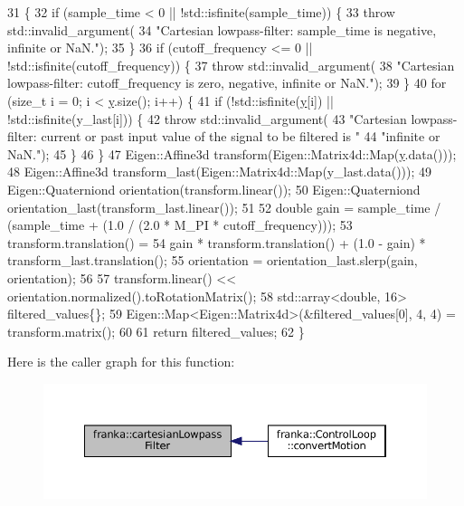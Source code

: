\begin{DoxyCode}
31                                                                        \{
32   \textcolor{keywordflow}{if} (sample\_time < 0 || !std::isfinite(sample\_time)) \{
33     \textcolor{keywordflow}{throw} std::invalid\_argument(
34         \textcolor{stringliteral}{"Cartesian lowpass-filter: sample\_time is negative, infinite or NaN."});
35   \}
36   \textcolor{keywordflow}{if} (cutoff\_frequency <= 0 || !std::isfinite(cutoff\_frequency)) \{
37     \textcolor{keywordflow}{throw} std::invalid\_argument(
38         \textcolor{stringliteral}{"Cartesian lowpass-filter: cutoff\_frequency is zero, negative, infinite or NaN."});
39   \}
40   \textcolor{keywordflow}{for} (\textcolor{keywordtype}{size\_t} i = 0; i < \hyperlink{namespaceinteractive__marker_a5e45ec67a60dd2f10e5b53a9274e4730}{y}.size(); i++) \{
41     \textcolor{keywordflow}{if} (!std::isfinite(\hyperlink{namespaceinteractive__marker_a5e45ec67a60dd2f10e5b53a9274e4730}{y}[i]) || !std::isfinite(y\_last[i])) \{
42       \textcolor{keywordflow}{throw} std::invalid\_argument(
43           \textcolor{stringliteral}{"Cartesian lowpass-filter: current or past input value of the signal to be filtered is "}
44           \textcolor{stringliteral}{"infinite or NaN."});
45     \}
46   \}
47   Eigen::Affine3d transform(Eigen::Matrix4d::Map(\hyperlink{namespaceinteractive__marker_a5e45ec67a60dd2f10e5b53a9274e4730}{y}.data()));
48   Eigen::Affine3d transform\_last(Eigen::Matrix4d::Map(y\_last.data()));
49   Eigen::Quaterniond orientation(transform.linear());
50   Eigen::Quaterniond orientation\_last(transform\_last.linear());
51 
52   \textcolor{keywordtype}{double} gain = sample\_time / (sample\_time + (1.0 / (2.0 * M\_PI * cutoff\_frequency)));
53   transform.translation() =
54       gain * transform.translation() + (1.0 - gain) * transform\_last.translation();
55   orientation = orientation\_last.slerp(gain, orientation);
56 
57   transform.linear() << orientation.normalized().toRotationMatrix();
58   std::array<double, 16> filtered\_values\{\};
59   Eigen::Map<Eigen::Matrix4d>(&filtered\_values[0], 4, 4) = transform.matrix();
60 
61   \textcolor{keywordflow}{return} filtered\_values;
62 \}
\end{DoxyCode}
Here is the caller graph for this function\+:
\nopagebreak
\begin{figure}[H]
\begin{center}
\leavevmode
\includegraphics[width=350pt]{namespacefranka_a7c9b0bec78181cabee7466bc136996e6_icgraph}
\end{center}
\end{figure}
\mbox{\label{namespacefranka_a92a802942d91aff279534b952468dc51}} 
